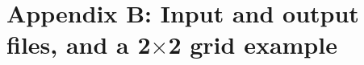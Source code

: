 \documentclass{article}
\newcommand{\code}[1]{\texttt{#1}}
\begin{document}
%
%
%
%
%		
%

\section*{Appendix B: Input and output files, and a 2$\times$2 grid example}
\end{document}
